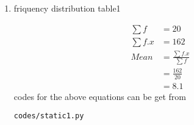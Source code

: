 \renewcommand{\theequation}{\theenumi}
\begin{enumerate}[label=\arabic*.,ref=\thesubsection.\theenumi]
\item 
\begin{table}[!ht]
\centering

\caption{friquency distribution table1 }
\end{table}
\begin{align}
\sum{f} &= 20
\\
\sum{f.x} &= 162
\\
Mean &= \frac{\sum{f.x}}{\sum{f}}
\\&= \frac{162}{20}
\\
&= 8.1
\end{align}
codes for the above equations can be get from
\begin{lstlisting}
codes/static1.py
\end{lstlisting}
\end{enumerate}